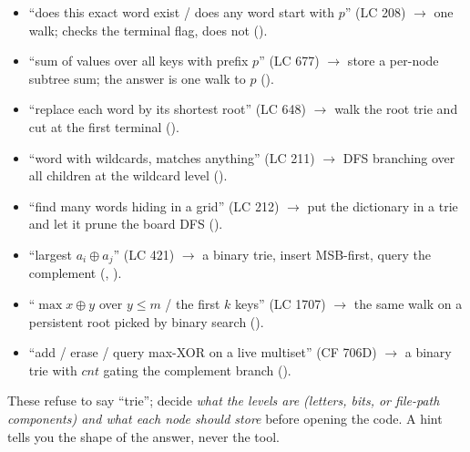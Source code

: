 \begin{itemize}[nosep, leftmargin=1.4em]
  \item ``does this exact word exist / does any word start with $p$'' (LC 208) $\longrightarrow$ one walk;
         checks the terminal flag,  does not ().
  \item ``sum of values over all keys with prefix $p$'' (LC 677) $\longrightarrow$ store a per-node subtree
        sum; the answer is one walk to $p$ ().
  \item ``replace each word by its shortest root'' (LC 648) $\longrightarrow$ walk the root trie and cut at
        the first terminal ().
  \item ``word with wildcards,  matches anything'' (LC 211) $\longrightarrow$ DFS branching over all
        children at the wildcard level ().
  \item ``find many words hiding in a grid'' (LC 212) $\longrightarrow$ put the dictionary in a trie and let
        it prune the board DFS ().
  \item ``largest $a_i \oplus a_j$'' (LC 421) $\longrightarrow$ a binary trie, insert MSB-first, query the
        complement (, ).
  \item ``$\max x \oplus y$ over $y \le m$ / the first $k$ keys'' (LC 1707) $\longrightarrow$ the same walk on
        a persistent root picked by binary search ().
  \item ``add / erase / query max-XOR on a live multiset'' (CF 706D) $\longrightarrow$ a binary trie with
        $\mathit{cnt}$ gating the complement branch ().
\end{itemize}


These refuse to say ``trie''; decide \emph{what the levels are (letters, bits, or file-path components) and
what each node should store} before opening the code. A hint tells you the shape of the answer, never the
tool.

